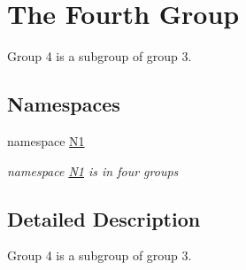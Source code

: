 \hypertarget{group__group4}{\section{The Fourth Group}
\label{group__group4}
}


Group 4 is a subgroup of group 3.  


\subsection*{Namespaces}
\begin{DoxyCompactItemize}
\item 
namespace \hyperlink{namespace_n1}{N1}
\begin{DoxyCompactList}\small\item\em namespace \hyperlink{namespace_n1}{N1} is in four groups \end{DoxyCompactList}\end{DoxyCompactItemize}


\subsection{Detailed Description}
Group 4 is a subgroup of group 3. 